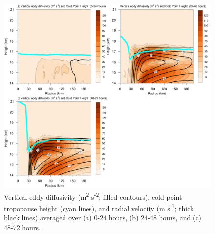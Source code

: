 \documentclass{ametsoc}
\begin{document}
\begin{figure}[ht]
\centerline{\includegraphics[width=39pc]{figures/khvten.png}}
\caption{Vertical eddy diffusivity (m\textsuperscript{2} s\textsuperscript{-2}; filled contours), cold point tropopause height (cyan lines), and radial velocity (m s\textsuperscript{-1}; thick black lines) averaged over (a) 0-24 hours, (b) 24-48 hours, and (c) 48-72 hours.}
\label{fig:radten}
\end{figure}

\end{document}
